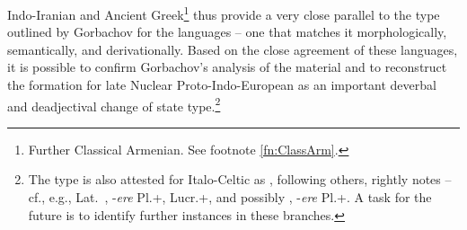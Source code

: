 \documentclass[output=paper,colorlinks,citecolor=brown]{langscibook}
\begin{document}
Indo-Iranian and Ancient Greek\footnote{Further Classical Armenian. See footnote \ref{fn:ClassArm}.}  thus provide a very close parallel to the type outlined by Gorbachov for the  languages -- one that matches it morphologically, semantically, and derivationally. Based on the close agreement of these languages, it is possible to confirm Gorbachov’s analysis of the  material and to reconstruct the formation for late Nuclear Proto-Indo-European as an important deverbal and deadjectival   change of state type.\footnote{The type is also attested for Italo-Celtic as \citet[217]{Gorbachov2007}, following others, rightly notes -- cf., e.g., Lat.\ , -\textit{ere} Pl.+,   Lucr.+, and possibly  , -\textit{ere} Pl.+. A task for the future is to identify further instances in these branches.} 
\end{document}
